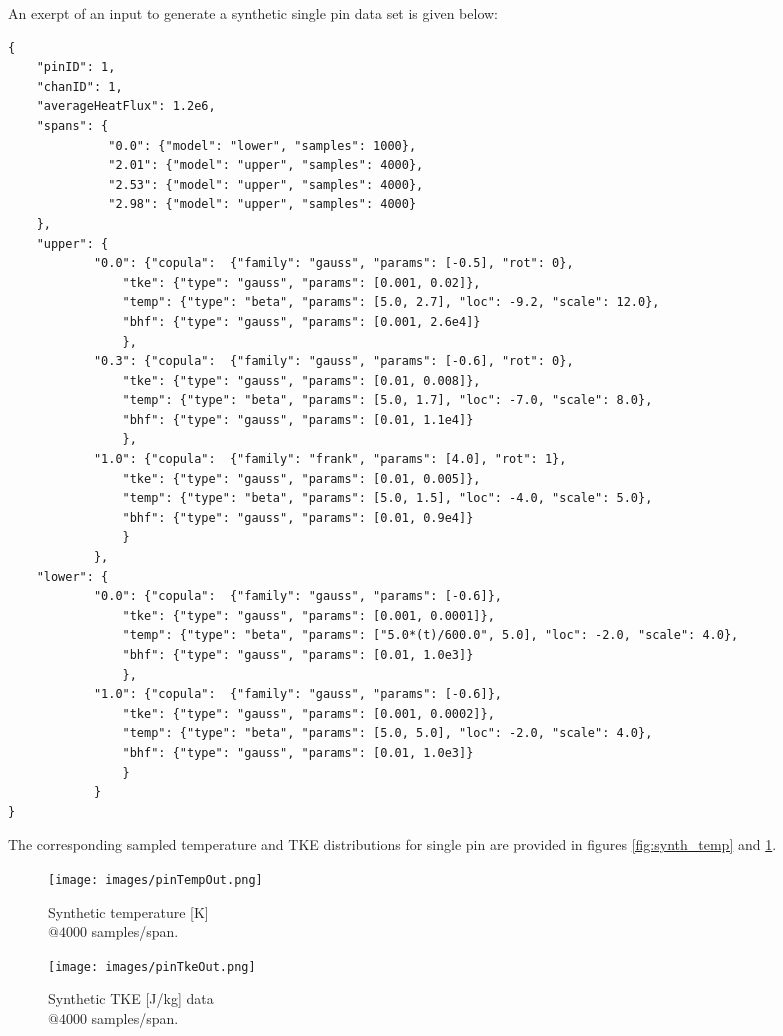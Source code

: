 An exerpt of an input to generate a synthetic single pin data set is given below:
\tiny
\begin{lstlisting}[language=XML]
{
    "pinID": 1,
    "chanID": 1,
    "averageHeatFlux": 1.2e6,
    "spans": {
              "0.0": {"model": "lower", "samples": 1000},
              "2.01": {"model": "upper", "samples": 4000},
              "2.53": {"model": "upper", "samples": 4000},
              "2.98": {"model": "upper", "samples": 4000}
    },
    "upper": {
            "0.0": {"copula":  {"family": "gauss", "params": [-0.5], "rot": 0},
                "tke": {"type": "gauss", "params": [0.001, 0.02]},
                "temp": {"type": "beta", "params": [5.0, 2.7], "loc": -9.2, "scale": 12.0},
                "bhf": {"type": "gauss", "params": [0.001, 2.6e4]}
                },
            "0.3": {"copula":  {"family": "gauss", "params": [-0.6], "rot": 0},
                "tke": {"type": "gauss", "params": [0.01, 0.008]},
                "temp": {"type": "beta", "params": [5.0, 1.7], "loc": -7.0, "scale": 8.0},
                "bhf": {"type": "gauss", "params": [0.01, 1.1e4]}
                },
            "1.0": {"copula":  {"family": "frank", "params": [4.0], "rot": 1},
                "tke": {"type": "gauss", "params": [0.01, 0.005]},
                "temp": {"type": "beta", "params": [5.0, 1.5], "loc": -4.0, "scale": 5.0},
                "bhf": {"type": "gauss", "params": [0.01, 0.9e4]}
                }
            },
    "lower": {
            "0.0": {"copula":  {"family": "gauss", "params": [-0.6]},
                "tke": {"type": "gauss", "params": [0.001, 0.0001]},
                "temp": {"type": "beta", "params": ["5.0*(t)/600.0", 5.0], "loc": -2.0, "scale": 4.0},
                "bhf": {"type": "gauss", "params": [0.01, 1.0e3]}
                },
            "1.0": {"copula":  {"family": "gauss", "params": [-0.6]},
                "tke": {"type": "gauss", "params": [0.001, 0.0002]},
                "temp": {"type": "beta", "params": [5.0, 5.0], "loc": -2.0, "scale": 4.0},
                "bhf": {"type": "gauss", "params": [0.01, 1.0e3]}
                }
            }
}
\end{lstlisting}
\normalsize

The corresponding sampled temperature and TKE distributions for single pin are provided in figures \ref{fig:synth_temp} and \ref{fig:synth_tke}. \\

\begin{figure}[!htbp]
\centering
\begin{minipage}{.45\textwidth}
  \texttt{[image: images/pinTempOut.png]}
\caption{Synthetic temperature [K] \\
         $@4000$ samples/span.}
\label{fig:synth_temp}
\end{minipage}%
\begin{minipage}{.45\textwidth}
  \texttt{[image: images/pinTkeOut.png]}
\caption{Synthetic TKE [J/kg] data \\
         $@4000$ samples/span.}
\label{fig:synth_tke}
\end{minipage}
\end{figure}

